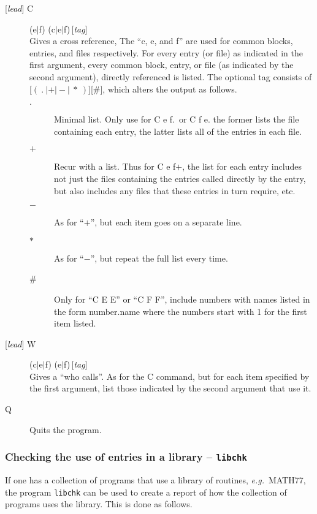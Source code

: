 \documentclass[twoside]{MATH77}
\begin{document}
\begin{description}
\begin{description}
\end{description}

\item[{[{\em lead}]} C] (e$|$f) (c$|$e$|$f)\,[{\em tag}]\\
Gives a cross reference,  The ``c, e, and f'' are used for common blocks,
entries, and files respectively.  For every entry (or file) as indicated
in the first argument, every common block, entry, or file (as indicated
by the second argument), directly referenced is listed.  The optional tag
consists of [$(\ .\ |+|-|\ *\ )$][\#], which alters the output as follows.
\begin{description}
\item[$.$] Minimal list. Only use for C e f.\, or C f e.\; the former
lists the file containing each entry, the latter lists all of the entries
in each file.
\item[$+$] Recur with a list.  Thus for C e f$+$, the list for each entry
includes not just the files containing the entries called directly by the
entry, but also includes any files that these entries in turn require,
etc.
\item[$-$] As for ``$+$'', but each item goes on a separate line.
\item[$*$] As for ``$-$'', but repeat the full list every time.
\item[\#] Only for ``C E E'' or ``C F F'', include numbers with names
listed in the form number.name where the numbers start with 1 for the
first item listed.
\end{description}
\item[{[{\em lead}]} W] (c$|$e$|$f) (e$|$f)\,[{\em tag}]\\
Gives a ``who calls''.  As for the C command, but for each item specified
by the first argument, list those indicated by the second argument that
use it.
\item[Q] Quits the program.
\end{description}

\subsubsection{Checking the use of entries in a library -- {\tt libchk}}

If one has a collection of programs that use a library of routines, {\em
e.g.}\ MATH77, the program {\tt libchk} can be used to create a report of
how the collection of programs uses the library.  This is done as follows.
\end{document}
